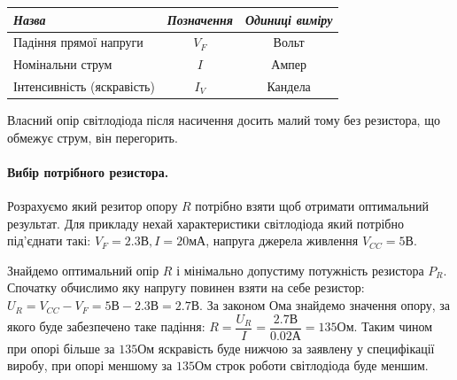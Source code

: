 \documentclass[12pt,a4paper]{book}  %
\begin{document}
\begin{figure}[h!]
\label{ris:image}
\end{figure}



\begin{center}
\begin{tabular}{|l|c|c|}
\hline
\textit{Назва} & \textit{Позначення} & \textit{Одиниці виміру} \\
\hline
Падіння прямої напруги & $V_F$ & Вольт \\
\hline		
Номінальни струм & $I$ & Ампер \\
\hline
Інтенсивність (яскравість) & $I_V$ & Кандела \\
\hline
\end{tabular}
\end{center}

Власний опір світлодіода після насичення досить малий тому без резистора, що обмежує струм, він перегорить.

\paragraph{Вибір потрібного резистора.}

Розрахуємо який резитор опору $R$ потрібно взяти щоб отримати оптимальний результат. Для прикладу нехай характеристики світлодіода який потрібно під'єднати такі: $V_F = 2.3\text{В}, I = 20\text{мА}$, напруга джерела живлення $V_{CC} = 5\text{В}$.

Знайдемо оптимальний опір $R$ і мінімально допустиму потужність резистора $P_R$.
Спочатку обчислимо яку напругу повинен взяти на себе резистор:
$U_R = V_{CC} - V_F = 5 \text{В} - 2.3\text{В} = 2.7\text{В}$.
За законом Ома знайдемо значення опору, за якого буде забезпечено таке падіння:
$R = \dfrac{U_R}{I} = \dfrac{2.7 \text{В}}{0.02 \text{А}} = 135 \text{Ом}$.
Таким чином при опорі більше за $135\text{Ом}$ яскравість буде нижчою за заявлену у специфікації виробу, при опорі меншому за $135\text{Ом}$ строк роботи світлодіода буде меншим.
\end{document}
